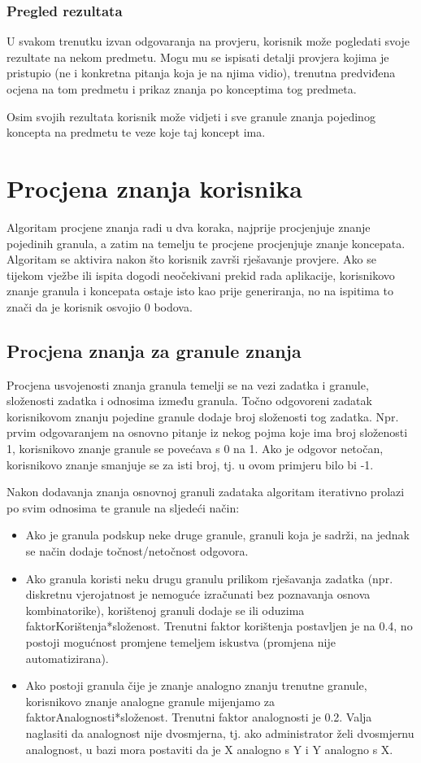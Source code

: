 \documentclass[times, utf8, zavrsni, numeric]{fer}
\begin{document}
\subsubsection{Pregled rezultata}
U svakom trenutku izvan odgovaranja na provjeru, korisnik može pogledati svoje rezultate na nekom predmetu. Mogu mu se ispisati detalji provjera kojima je pristupio (ne i konkretna pitanja koja je na njima vidio), trenutna predviđena ocjena na tom predmetu i prikaz znanja po konceptima tog predmeta.
\par
Osim svojih rezultata korisnik može vidjeti i sve granule znanja pojedinog koncepta na predmetu te veze koje taj koncept ima.

\section{Procjena znanja korisnika}
Algoritam procjene znanja radi u dva koraka, najprije procjenjuje znanje pojedinih granula, a zatim na temelju te procjene procjenjuje znanje koncepata. Algoritam se aktivira nakon što korisnik završi rješavanje provjere. Ako se tijekom vježbe ili ispita dogodi neočekivani prekid rada aplikacije, korisnikovo znanje granula i koncepata ostaje isto kao prije generiranja, no na ispitima to znači da je korisnik osvojio 0 bodova.

\subsection{Procjena znanja za granule znanja}
Procjena usvojenosti znanja granula temelji se na vezi zadatka i granule, složenosti zadatka i odnosima između granula. Točno odgovoreni zadatak korisnikovom znanju pojedine granule dodaje broj složenosti tog zadatka. Npr. prvim odgovaranjem na osnovno pitanje iz nekog pojma koje ima broj složenosti 1, korisnikovo znanje granule se povećava s 0 na 1. Ako je odgovor netočan, korisnikovo znanje smanjuje se za isti broj, tj. u ovom primjeru bilo bi -1.
\par
Nakon dodavanja znanja osnovnoj granuli zadataka algoritam iterativno prolazi po svim odnosima te granule na sljedeći način:
\begin{itemize}
	\item Ako je granula podskup neke druge granule, granuli koja je sadrži, na jednak se način dodaje točnost/netočnost odgovora.
	\item Ako granula koristi neku drugu granulu prilikom rješavanja zadatka (npr. diskretnu vjerojatnost je nemoguće izračunati bez poznavanja osnova kombinatorike), korištenoj granuli dodaje se ili oduzima faktorKorištenja*složenost. Trenutni faktor korištenja postavljen je na 0.4, no postoji mogućnost promjene temeljem iskustva (promjena nije automatizirana).
	\item Ako postoji granula čije je znanje analogno znanju trenutne granule, korisnikovo znanje analogne granule mijenjamo za faktorAnalognosti*složenost. Trenutni faktor analognosti je 0.2. Valja naglasiti da analognost nije dvosmjerna, tj. ako administrator želi dvosmjernu analognost, u bazi mora postaviti da je X analogno s Y i Y analogno s X.
\end{itemize}
\end{document}
